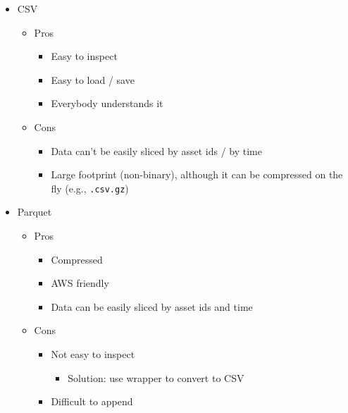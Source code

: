 \documentclass[11pt, reqno]{amsart}
\theoremstyle{definition}
\theoremstyle{remark}
\begin{document}
\begin{itemize}
  \item CSV
        \begin{itemize}

          \item Pros
                \begin{itemize}
                  \item Easy to inspect
                  \item Easy to load / save
                  \item Everybody understands it
                \end{itemize}

          \item Cons
                \begin{itemize}
                  \item Data can't be easily sliced by asset ids / by time
                  \item Large footprint (non-binary), although it can be compressed on the
                        fly (e.g., \verb|.csv.gz|)
                \end{itemize}
        \end{itemize}

  \item Parquet
        \begin{itemize}

          \item Pros
                \begin{itemize}
                  \item Compressed
                  \item AWS friendly
                  \item Data can be easily sliced by asset ids and time
                \end{itemize}

          \item Cons
                \begin{itemize}
                  \item Not easy to inspect

                        \begin{itemize}
                          \item Solution: use wrapper to convert to CSV
                        \end{itemize}
                  \item Difficult to append


\end{itemize}
\end{itemize}
\end{itemize}
\end{document}
